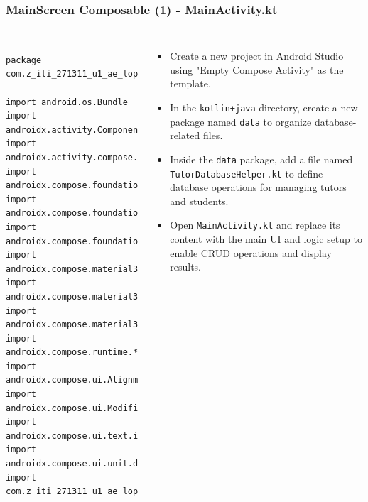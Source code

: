 \documentclass[pdf,
serif,
compress,
xcolor=table,
dvipsnames,
spanish,
aspectratio=169]{beamer}
\begin{document}

\begin{frame}[fragile]
    \frametitle{MainScreen Composable (1) - MainActivity.kt}
\begin{columns}
\begin{verbatim}

package com.z_iti_271311_u1_ae_lopez_leal_antonio_isai

import android.os.Bundle
import androidx.activity.ComponentActivity
import androidx.activity.compose.setContent
import androidx.compose.foundation.layout.*
import androidx.compose.foundation.lazy.LazyColumn
import androidx.compose.foundation.lazy.items
import androidx.compose.material3.Button
import androidx.compose.material3.Text
import androidx.compose.material3.TextField
import androidx.compose.runtime.*
import androidx.compose.ui.Alignment
import androidx.compose.ui.Modifier
import androidx.compose.ui.text.input.TextFieldValue
import androidx.compose.ui.unit.dp
import com.z_iti_271311_u1_ae_lopez_leal_antonio_isai.data.TutorDatabaseHelper

\end{verbatim}

\begin{itemize}\tiny
    \item Create a new project in Android Studio using "Empty Compose Activity" as the template.
    
    \item In the \texttt{kotlin+java} directory, create a new package named \texttt{data} to organize database-related files.
    \item Inside the \texttt{data} package, add a file named \texttt{TutorDatabaseHelper.kt} to define database operations for managing tutors and students.
    \item Open \texttt{MainActivity.kt} and replace its content with the main UI and logic setup to enable CRUD operations and display results.
\end{itemize}

\end{columns}
\end{frame}

\end{document}
